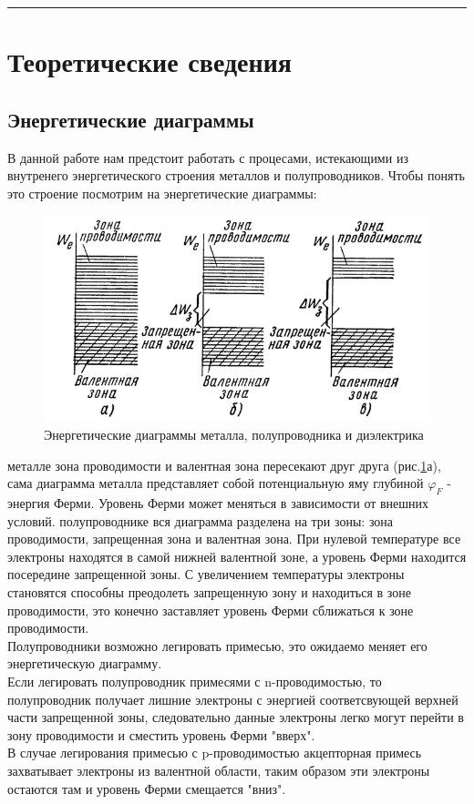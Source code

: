 \documentclass[a4paper,12pt]{article} %
\begin{document}
\medskip\hrule\medskip

\section{Теоретические сведения}
\subsection{Энергетические диаграммы}
В данной работе нам предстоит работать с процесами, истекающими из внутренего энергетического строения металлов и полупроводников. Чтобы понять это строение посмотрим на энергетические диаграммы:
\begin{figure}[h!]
    \centering
    \includegraphics[width=15cm]{energ_1.png}
        \caption{Энергетические диаграммы металла, полупроводника и диэлектрика}
    \label{1}
\end{figure}
\begin{itemize}
     металле зона проводимости и валентная зона пересекают друг друга (рис.\ref{1}а), сама диаграмма металла представляет собой потенциальную яму глубиной $\varphi_F$ - энергия Ферми. Уровень Ферми может меняться в зависимости от внешних условий.
     полупроводнике вся диаграмма разделена на три зоны: зона проводимости, запрещенная зона и валентная зона. При нулевой температуре все электроны находятся в самой нижней валентной зоне, а уровень Ферми находится посередине запрещенной зоны. С увеличением температуры электроны становятся способны преодолеть запрещенную зону и находиться в зоне проводимости, это конечно заставляет уровень Ферми сближаться к зоне проводимости.\\
Полупроводники возможно легировать примесью, это ожидаемо меняет его энергетическую диаграмму.\\
Если легировать полупроводник примесями с n-проводимостью, то полупроводник получает лишние электроны с энергией соответсвующей верхней части запрещенной зоны, следовательно данные электроны легко могут перейти в зону проводимости и сместить уровень Ферми "вверх".\\
В случае легирования примесью с p-проводимостью акцепторная примесь захватывает электроны из валентной области, таким образом эти электроны остаются там и уровень Ферми смещается "вниз".

\end{itemize}
\end{document}
